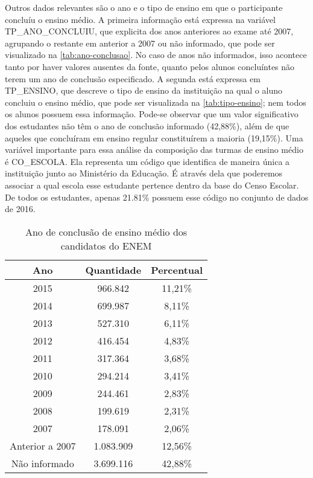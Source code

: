   Outros dados relevantes são o ano e o tipo de ensino em que o participante concluíu o ensino médio. A primeira informação está expressa na variável TP\_ANO\_CONCLUIU, que explicita dos anos anteriores ao exame até 2007, agrupando o restante em anterior a 2007 ou não informado, que pode ser visualizado na \autoref{tab:ano-conclusao}. No caso de anos não informados, isso acontece tanto por haver valores ausentes da fonte, quanto pelos alunos concluíntes não terem um ano de conclusão especificado. A segunda está expressa em TP\_ENSINO, que descreve o tipo de ensino da instituição na qual o aluno concluiu o ensino médio, que pode ser visualizada na \autoref{tab:tipo-ensino}; nem todos os alunos possuem essa informação. Pode-se observar que um valor significativo dos estudantes não têm o ano de conclusão informado (42,88\%), além de que aqueles que concluíram em ensino regular constituírem a maioria (19,15\%). Uma variável importante para essa análise da composição das turmas de ensino médio é CO\_ESCOLA. Ela representa um código que identifica de maneira única a instituição junto ao Ministério da Educação. É através dela que poderemos associar a qual escola esse estudante pertence dentro da base do Censo Escolar. De todos os estudantes, apenas 21.81\% possuem esse código no conjunto de dados de 2016.

  \begin{table}[h]
    \begin{tabular}{ccc}
    \hline
    \multicolumn{1}{c}{\textbf{Ano}} & \textbf{Quantidade} & \textbf{Percentual} \\ \hline
    2015                             & 966.842              & 11,21\%             \\ \hline
    2014                             & 699.987              & 8,11\%              \\ \hline
    2013                             & 527.310              & 6,11\%              \\ \hline
    2012                             & 416.454              & 4,83\%              \\ \hline
    2011                             & 317.364              & 3,68\%              \\ \hline
    2010                             & 294.214              & 3,41\%              \\ \hline
    2009                             & 244.461              & 2,83\%              \\ \hline
    2008                             & 199.619              & 2,31\%              \\ \hline
    2007                             & 178.091              & 2,06\%              \\ \hline
    Anterior a 2007                  & 1.083.909             & 12,56\%             \\ \hline
    Não informado                    & 3.699.116             & 42,88\%             \\ \hline
    \end{tabular}
    \caption{Ano de conclusão de ensino médio dos candidatos do ENEM}
    \label{tab:ano-conclusao}
    \end{table}

